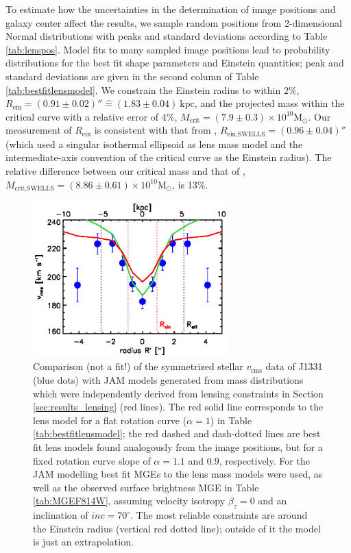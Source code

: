 \documentclass[useAMS,usenatbib]{mnras}
\begin{document}
To estimate how the uncertainties in the determination of image positions and galaxy center affect the results, we sample random positions from 2-dimensional Normal distributions with peaks and standard deviations according to Table \ref{tab:lenspos}. Model fits to many sampled image positions lead to probability distributions for the best fit shape parameters and Einstein quantities; peak and standard deviations are given in the second column of Table \ref{tab:bestfitlensmodel}. We constrain the Einstein radius to within 2\%, $R_\text{ein} = (0.91 \pm 0.02)'' \hat{=}(1.83\pm0.04)~\text{kpc}$, and the projected mass within the critical curve with a relative error of 4\%, $M_\text{crit} =(7.9\pm0.3) \times 10^{10} \text{M}_\odot$. Our measurement of $R_\text{ein}$ is consistent with that from \citet{SWELLSIII}, $R_\text{ein,SWELLS} = (0.96 \pm 0.04)''$ (which used a singular isothermal ellipsoid as lens mass model and the intermediate-axis convention of the critical curve as the Einstein radius). The relative difference between our critical mass and that of \citet{SWELLSIII}, $M_\text{crit,SWELLS} =(8.86\pm0.61) \times 10^{10} \text{M}_\odot$, is 13\%.

\begin{figure}
  \centering
  \includegraphics[height=6cm]{fig/lensing_JAM_comparision.ps}
  \caption{Comparison (not a fit!) of the symmetrized stellar $v_\text{rms}$ data of J1331 (blue dots) with JAM models generated from mass distributions which were independently derived from lensing constraints in Section \ref{sec:results_lensing} (red lines). The red solid line corresponds to the lens model for a flat rotation curve ($\alpha = 1$) in Table \ref{tab:bestfitlensmodel}; the red dashed and dash-dotted lines are best fit lens models found analogously from the image positions, but for a fixed rotation curve slope of $\alpha = 1.1$ and $0.9$, respectively. For the JAM modelling best fit MGEs to the lens mass models were used, as well as the observed surface brightness MGE in Table \ref{tab:MGEF814W}, assuming velocity isotropy $\beta_z = 0$ and an inclination of $inc = 70^\circ$. The most reliable constraints are around the Einstein radius (vertical red dotted line); outside of it the model is just an extrapolation.}
  \label{fig:JAM_modelL}
\end{figure}
\end{document}
